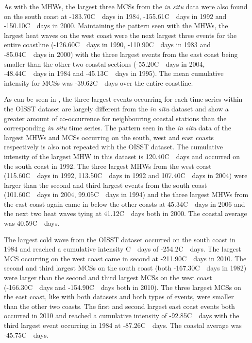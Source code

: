 \documentclass[a4paper,10pt,review]{elsarticle}
\begin{document}
As with the MHWs, the largest three MCSs from the \emph{in situ} data were also found on the south coast at -183.70\degree C~\texttimes~days in 1984, -155.61\degree C~\texttimes~days in 1992 and -150.10\degree C~\texttimes~days in 2000. Maintaining the pattern seen with the MHWs, the largest heat waves on the west coast were the next largest three events for the entire coastline (-126.60\degree C~\texttimes~days in 1990, -110.90\degree C~\texttimes~days in 1983 and -85.04\degree C~\texttimes~days in 2000) with the three largest events from the east coast being smaller than the other two coastal sections (-55.20\degree C~\texttimes~days in 2004, -48.44\degree C~\texttimes~days in 1984 and -45.13\degree C~\texttimes~days in 1995). The mean cumulative intensity for MCSs was -39.62\degree C~\texttimes~days over the entire coastline.

As can be seen in , the three largest events occurring for each time series within the OISST dataset are largely different from the \emph{in situ} dataset and show a greater amount of co-occurrence for neighbouring coastal stations than the corresponding \emph{in situ} time series. The pattern seen in the \emph{in situ} data of the largest MHWs and MCSs occurring on the south, west and east coasts respectively is also not repeated with the OISST dataset. The cumulative intensity of the largest MHW in this dataset is 120.40\degree C~\texttimes~days and occurred on the south coast in 1992. The three largest MHWs from the west coast (115.60\degree C~\texttimes~days in 1992, 113.50\degree C~\texttimes~days in 1992 and 107.40\degree C~\texttimes~days in 2004) were larger than the second and third largest events from the south coast (101.60\degree C~\texttimes~days in 2004, 99.05\degree C~\texttimes~days in 1994) and the three largest MHWs from the east coast again came in below the other coasts at 45.34\degree C~\texttimes~days in 2006 and the next two heat waves tying at 41.12\degree C~\texttimes~days both in 2000. The coastal average was 40.59\degree C~\texttimes~days.

The largest cold wave from the OISST dataset occurred on the south coast in 1984 and reached a cumulative intensity \degree C~\texttimes~days of -254.2\degree C~\texttimes~days. The largest MCS occurring on the west coast came in second at -211.90\degree C~\texttimes~days in 2010. The second and third largest MCSs on the south coast (both -167.30\degree C~\texttimes~days in 1982) were larger than the second and third largest MCSs on the west coast (-166.30\degree C~\texttimes~days and -154.90\degree C~\texttimes~days both in 2010). The three largest MCSs on the east coast, like with both datasets and both types of events, were smaller than the other two coasts. The first and second largest east coast events both occurred in 2010 and reached a cumulative intensity of -92.85\degree C~\texttimes~days with the third largest event occurring in 1984 at -87.26\degree C~\texttimes~days. The coastal average was -45.75\degree C~\texttimes~days.
\end{document}
